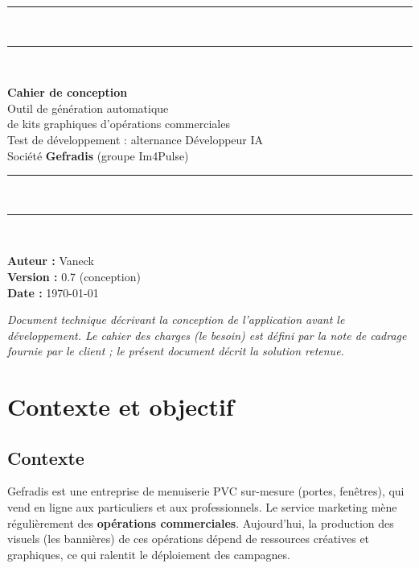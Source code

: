 \documentclass[11pt,a4paper]{article}
\begin{document}
\begin{titlepage}
\thispagestyle{empty}
\vspace*{1.5cm}
{\color{gefblue}\rule{\textwidth}{3pt}}\\[0.3cm]
{\color{gefyellow}\rule{\textwidth}{8pt}}\\[1.5cm]

\begin{flushleft}
{\sffamily\Huge\bfseries\color{gefblue} Cahier de conception}\\[0.6cm]
{\sffamily\LARGE\color{gefmidnight} Outil de génération automatique\\ de kits graphiques d'opérations commerciales}\\[1.0cm]
{\sffamily\large Test de développement : alternance Développeur IA}\\[0.2cm]
{\sffamily\large Société \textbf{Gefradis} (groupe Im4Pulse)}\\[2.0cm]
\end{flushleft}

{\color{gefyellow}\rule{\textwidth}{8pt}}\\[0.3cm]
{\color{gefblue}\rule{\textwidth}{3pt}}\\[1.2cm]

\begin{flushleft}
{\sffamily\large
\textbf{Auteur :} Vaneck \\[0.2cm]
\textbf{Version :} 0.7 (conception)\\[0.2cm]
\textbf{Date :} \today
}
\end{flushleft}

\vfill
{\small\itshape Document technique décrivant la conception de l'application
avant le développement. Le cahier des charges (le besoin) est défini par la note
de cadrage fournie par le client ; le présent document décrit la solution retenue.}
\end{titlepage}

\tableofcontents
\newpage

\section{Contexte et objectif}

\subsection{Contexte}
Gefradis est une entreprise de menuiserie PVC sur-mesure (portes, fenêtres),
qui vend en ligne aux particuliers et aux professionnels. Le service marketing
mène régulièrement des \textbf{opérations commerciales}. Aujourd'hui,
la production des visuels (les bannières) de ces opérations dépend de ressources
créatives et graphiques, ce qui ralentit le déploiement des campagnes.
\end{document}
